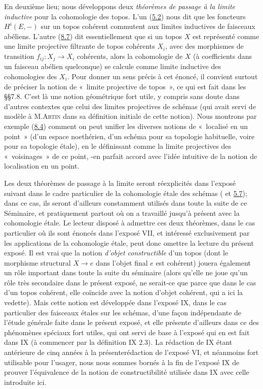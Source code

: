 En deuxième lieu; nous développons deux \emph{théorèmes de passage à
la limite inductive} pour la cohomologie des topos. L'un (\hyperref[VI.cor5.2]{5.2}) nous
dit que les foncteurs $H^{i}(E, -)$ \pageoriginale sur un topos
cohérent commutent aux limites inductives de faisceaux abéliens. L'autre (\hyperref[VI.subsec8.7]{8.7}) dit
essentiellement que si un topos $X$ est représenté comme une limite
projective filtrante de topos cohérents $X_i$, avec des morphismes
de transition $f_{ij} : X_j \to X_i$ cohérents, alors la cohomologie
de $X$ (à coefficients dans un faisceau abélien quelconque) se
calcule comme limite inductive des cohomologies des $X_i$. Pour
donner un sens précis à cet énoncé, il convient surtout de préciser
la notion de « limite projective de topos », ce qui est fait dans
les \S\S 7.8. C'est là une notion géométrique fort utile, y compris
sans doute dans d'autres contextes que celui des limites projectives
de schémas (qui avait servi de modèle à M.\textsc{Artin} dans sa définition
initiale de cette notion). Nous montrons par exemple (\hyperref[VI.subsec8.4]{8.4}) comment
on peut unifier les diverses notions de « localisé en un point »
(d'un espace noethérien, d'un schéma pour sa topologie habituelle,
voire pour sa topologie étale), en le définissant comme la limite
projectives des « voisinages » de ce point, -en parfait accord
avec l'idée intuitive de la notion de localisation en un point.

Les deux théorèmes de passage à la limite seront réexplicités dans
l'exposé suivant dans le cadre particulier de la cohomologie étale des
schémas ( et \hyperref[VI.prop5.7]{5.7}); dans ce cas, ils seront d'ailleurs
constamment utilisés dans toute la suite de ce Séminaire, et
pratiquement partout où on a travaillé jusqu'à présent avec la
cohomologie étale. Le lecteur disposé à admettre ces deux théorèmes,
dans le cas particulier où ils sont énoncés dans l'exposé VII, et
intéressé exclusivement par les applications de la cohomologie étale,
peut donc omettre la lecture du présent exposé. Il est vrai que la
notion \emph{d'objet constructible} d'un topos (\ie dont le morphisme
structural $X \to e$ dans l'objet final $e$ est cohérent) jouera
également un rôle important dans toute la suite du séminaire (alors
qu'elle ne joue qu'un rôle très secondaire dans le présent exposé, ne
serait-ce que parce que dans le cas d'un topos cohérent, elle coïncide
avec la notion d'objet cohérent, qui a ici la vedette). Mais cette
notion est développée dans l'exposé IX, dans le cas particulier des
faisceaux étales sur les schémas, d'une façon indépendante de
l'étude générale faite dans le présent exposé, et elle présente
d'ailleurs dans ce des phénomènes spéciaux fort utiles, qui ont servi
de base à l'exposé qui en est fait dans IX (à commencer par la
définition IX 2.3). La rédaction de IX étant antérieure de cinq années
à la présente\pageoriginale rédaction de l'exposé VI, et néanmoins
fort utilisable pour l'usager, nous nous sommes bornés à la fin de l'exposé IX de
prouver l'équivalence de la notion de constructibilité utilisée dans
IX avec celle introduite ici.

